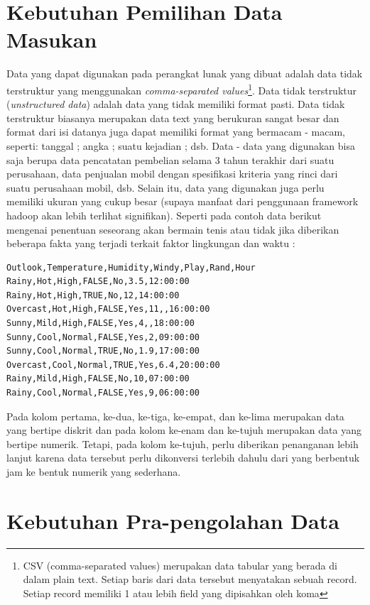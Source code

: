 \section{Kebutuhan Pemilihan Data Masukan}
Data yang dapat digunakan pada perangkat lunak yang dibuat adalah data tidak terstruktur yang menggunakan \textit{comma-separated values}\footnote{ CSV (comma-separated values) merupakan data tabular yang berada di dalam plain text. Setiap baris dari data tersebut menyatakan sebuah record. Setiap record memiliki 1 atau lebih field yang dipisahkan oleh koma}. Data tidak terstruktur (\textit{unstructured data}) adalah data yang tidak memiliki format pasti. Data tidak terstruktur biasanya merupakan data text yang berukuran sangat besar dan format dari isi datanya juga dapat memiliki format yang bermacam - macam, seperti: tanggal ; angka ; suatu kejadian ; dsb. 
Data - data yang digunakan bisa saja berupa data pencatatan pembelian selama 3 tahun terakhir dari suatu perusahaan, data penjualan mobil dengan spesifikasi kriteria yang rinci dari suatu perusahaan mobil, dsb. Selain itu, data yang digunakan juga perlu memiliki ukuran yang cukup besar (supaya manfaat dari penggunaan framework hadoop akan lebih terlihat signifikan). Seperti pada contoh data berikut mengenai penentuan seseorang akan bermain tenis atau tidak jika diberikan beberapa fakta yang terjadi terkait faktor lingkungan dan waktu :

\begin{lstlisting}
Outlook,Temperature,Humidity,Windy,Play,Rand,Hour
Rainy,Hot,High,FALSE,No,3.5,12:00:00
Rainy,Hot,High,TRUE,No,12,14:00:00
Overcast,Hot,High,FALSE,Yes,11,,16:00:00
Sunny,Mild,High,FALSE,Yes,4,,18:00:00
Sunny,Cool,Normal,FALSE,Yes,2,09:00:00
Sunny,Cool,Normal,TRUE,No,1.9,17:00:00
Overcast,Cool,Normal,TRUE,Yes,6.4,20:00:00
Rainy,Mild,High,FALSE,No,10,07:00:00
Rainy,Cool,Normal,FALSE,Yes,9,06:00:00
\end{lstlisting}
Pada kolom pertama, ke-dua, ke-tiga, ke-empat, dan ke-lima merupakan data yang bertipe diskrit dan pada kolom ke-enam dan ke-tujuh merupakan data yang bertipe numerik. Tetapi, pada kolom ke-tujuh, perlu diberikan penanganan lebih lanjut karena data tersebut perlu dikonversi terlebih dahulu dari yang berbentuk jam ke bentuk numerik yang sederhana.

\section{Kebutuhan Pra-pengolahan Data}

